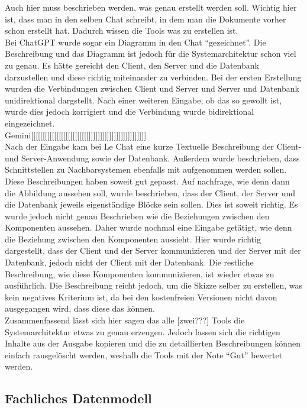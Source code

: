Auch hier muss beschrieben werden, was genau erstellt werden soll. Wichtig hier ist, dass man in den selben Chat schreibt, in dem man die Dokumente vorher
schon erstellt hat. Dadurch wissen die Tools was zu erstellen ist.\\
Bei ChatGPT wurde sogar ein Diagramm in den Chat ``gezeichnet''. Die Beschreibung und das Diagramm ist jedoch für die Systemarchitektur schon viel zu genau.
Es hätte gereicht den Client, den Server und die Datenbank darzustellen und diese richtig miteinander zu verbinden. Bei der ersten Erstellung wurden 
die Verbindungen zwischen Client und Server und Server und Datenbank unidirektional dargstellt. Nach einer weiteren Eingabe, ob das so gewollt ist, wurde 
dies jedoch korrigiert und die Verbindung wurde bidirektional eingezeichnet.\\
Gemini[[[[[[[[[[[[[[[[[[[[[[[[[]]]]]]]]]]]]]]]]]]]]]]]]]\\
Nach der Eingabe kam bei Le Chat eine kurze Textuelle Beschreibung der Client- und Server-Anwendung sowie der Datenbank. Außerdem wurde beschrieben, 
dass Schnittstellen zu Nachbarsystemen ebenfalls mit aufgenommen werden sollen. Diese Beschreibungen haben soweit gut gepasst. Auf nachfrage, wie denn 
dann die Abbildung aussehen soll, wurde beschrieben, dass der Client, der Server und die Datenbank jeweils eigenständige Blöcke sein sollen. Dies ist soweit
richtig. Es wurde jedoch nicht genau Beschrieben wie die Beziehungen zwischen den Komponenten aussehen. Daher wurde nochmal eine Eingabe getätigt, wie denn 
die Beziehung zwischen den Komponenten aussieht. Hier wurde richtig dargestellt, dass der Client und der Server kommunizieren und der Server mit der Datenbank, 
jedoch nicht der Client mit der Datenbank. Die restliche Beschreibung, wie diese Komponenten kommunizieren, ist wieder etwas zu ausführlich. Die Beschreibung 
reicht jedoch, um die Skizze selber zu erstellen, was kein negatives Kriterium ist, da bei den kostenfreien Versionen nicht davon ausgegangen wird, dass diese 
das können.\\

Zusammenfassend lässt sich hier sagen das alle [zwei???] Tools die Systemarchitektur etwas zu genau erzeugen. Jedoch lassen sich die richtigen Inhalte 
aus der Ausgabe kopieren und die zu detaillierten Beschreibungen können einfach rausgelöscht werden, weshalb die Tools mit der Note ``Gut'' bewertet werden.

\subsection*{Fachliches Datenmodell}

